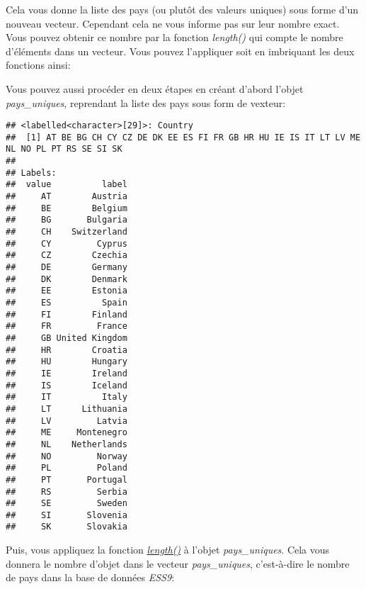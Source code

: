 \documentclass[
]{book}
\newenvironment{Shaded}{\begin{snugshade}}{\end{snugshade}}
\newcommand{\FunctionTok}[1]{\textcolor[rgb]{0.00,0.00,0.00}{#1}}
\newcommand{\NormalTok}[1]{#1}
\newcommand{\OtherTok}[1]{\textcolor[rgb]{0.56,0.35,0.01}{#1}}
\newcommand{\SpecialCharTok}[1]{\textcolor[rgb]{0.00,0.00,0.00}{#1}}
\begin{document}
Cela vous donne la liste des pays (ou plutôt des valeurs uniques) sous forme d'un nouveau vecteur. Cependant cela ne vous informe pas sur leur nombre exact. Vous pouvez obtenir ce nombre par la fonction \emph{length()} qui compte le nombre d'éléments dans un vecteur. Vous pouvez l'appliquer soit en imbriquant les deux fonctions ainsi:

\begin{Shaded}
\end{Shaded}

Vous pouvez aussi procéder en deux étapes en créant d'abord l'objet \emph{pays\_uniques}, reprendant la liste des pays sous form de vexteur:

\begin{Shaded}
\end{Shaded}

\begin{verbatim}
## <labelled<character>[29]>: Country
##  [1] AT BE BG CH CY CZ DE DK EE ES FI FR GB HR HU IE IS IT LT LV ME NL NO PL PT RS SE SI SK
## 
## Labels:
##  value          label
##     AT        Austria
##     BE        Belgium
##     BG       Bulgaria
##     CH    Switzerland
##     CY         Cyprus
##     CZ        Czechia
##     DE        Germany
##     DK        Denmark
##     EE        Estonia
##     ES          Spain
##     FI        Finland
##     FR         France
##     GB United Kingdom
##     HR        Croatia
##     HU        Hungary
##     IE        Ireland
##     IS        Iceland
##     IT          Italy
##     LT      Lithuania
##     LV         Latvia
##     ME     Montenegro
##     NL    Netherlands
##     NO         Norway
##     PL         Poland
##     PT       Portugal
##     RS         Serbia
##     SE         Sweden
##     SI       Slovenia
##     SK       Slovakia
\end{verbatim}

Puis, vous appliquez la fonction \emph{\href{https://www.rdocumentation.org/packages/base/versions/3.6.2/topics/length}{length()}} à l'objet \emph{pays\_uniques}. Cela vous donnera le nombre d'objet dans le vecteur \emph{pays\_uniques}, c'est-à-dire le nombre de pays dans la base de données \emph{ESS9}:
\end{document}

